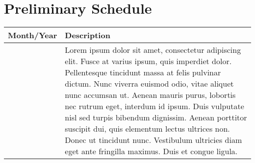 %
\chapter{Preliminary Schedule}
\label{sec:schedule}




\begin{table}[ht]
\centering
\begin{tabularx}{\linewidth}{
    |>{\hsize=0.5\hsize}X|%
    >{\hsize=1.5\hsize}X|%
} \hline
 \textbf{Month/Year} & \textbf{Description} \\ \hline
\rowcolor{mymagenta1}{July 2016} & {Lorem ipsum dolor sit amet, consectetur adipiscing elit. Fusce at varius ipsum, quis imperdiet dolor. Pellentesque tincidunt massa at felis pulvinar dictum. Nunc viverra euismod odio, vitae aliquet nunc accumsan ut. Aenean mauris purus, lobortis nec rutrum eget, interdum id ipsum. Duis vulputate nisl sed turpis bibendum dignissim. Aenean porttitor suscipit dui, quis elementum lectus ultrices non. Donec ut tincidunt nunc. Vestibulum ultricies diam eget ante fringilla maximus. Duis et congue ligula.

}
\end{tabularx}
\end{table}
